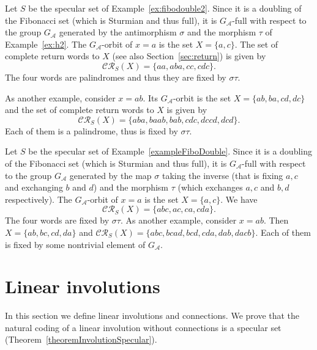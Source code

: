 \documentclass[preprint,12pt]{elsarticle}
\newcommand\CR{\mathcal{CR}}
\numberwithin{theorem}{section}
\numberwithin{equation}{section}
\numberwithin{figure}{section}
\numberwithin{table}{section}
\begin{document}
\begin{example}
\label{ex:fibodoubleh2}
Let $S$ be the specular set of Example~\ref{ex:fibodouble2}.
Since it is a doubling of the Fibonacci set (which is Sturmian and thus full), it is $G_\mathcal{A}$-full with respect to the group $G_\mathcal{A}$ generated by the antimorphism $\sigma$ and the morphism $\tau$ of Example~\ref{ex:h2}.
The $G_\mathcal{A}$-orbit of $x=a$ is the set $X=\{a,c\}$.
The set of complete return words to $X$ (see also Section~\ref{sec:return}) is given by
\begin{displaymath}
\CR_S(X)=\{ aa, aba, cc, cdc\}.
\end{displaymath}
The four words are palindromes and thus they are fixed by $\sigma\tau$.

As another example, consider $x=ab$.
Its $G_\mathcal{A}$-orbit is the set $X = \{ ab, ba, cd, dc \}$ and the set of complete return words to $X$ is given by
$$
\CR_S(X)=\{ aba,baab,bab,cdc,dccd,dcd\}.
$$
Each of them is a palindrome, thus is fixed by $\sigma \tau$.
\end{example}

\begin{example}
Let $S$ be the specular set of Example~\ref{exampleFiboDouble}.
Since it is  a doubling of the Fibonacci set (which is Sturmian and thus full), it is $G_\mathcal{A}$-full with respect to the group $G_\mathcal{A}$ generated by the map $\sigma$ taking the inverse (that is fixing $a,c$ and exchanging $b$ and $d$) and the morphism $\tau$ (which exchanges $a,c$ and $b,d$ respectively).
The $G_\mathcal{A}$-orbit of $x=a$ is the set $X=\{a,c\}$.
We have
\begin{displaymath}
\CR_S(X)=\{abc,ac,ca,cda\}.
\end{displaymath}
The four words are fixed by $\sigma\tau$.
 As another example, consider $x=ab$. Then
$X=\{ab,bc,cd,da\}$ and $\CR_S(X)=\{abc,bcad,bcd,cda,dab,dacb\}$.
Each of them is fixed by some nontrivial element of $G_\mathcal{A}$.
\end{example}










\section{Linear involutions}
\label{sectionInvolutions}
In this section we define linear involutions and connections.
We prove that the natural coding of a linear involution without connections is a specular set (Theorem~\ref{theoremInvolutionSpecular}).
\end{document}
